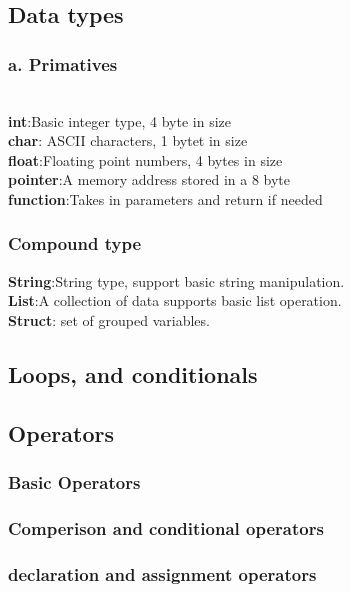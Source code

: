 \documentclass[11pt]{article}
\begin{document}
\subsection*{Data types}

\subsubsection*{a. Primatives}\\

\quad\space\space\textbf{int}:Basic integer type, 4 byte in size \\

\textbf{char}: ASCII characters, 1 bytet in size\\

\textbf{float}:Floating point numbers, 4 bytes in size\\

\textbf{pointer}:A memory address stored in a 8 byte\\

\textbf{function}:Takes in parameters and return if needed
\subsubsection{Compound type}

\quad\space\space\textbf{String}:String type, support basic string manipulation.\\

\textbf{List}:A collection of data supports basic list operation.\\

\textbf{Struct}: set of grouped variables.\\
\subsection{Loops, and conditionals}
\subsection{Operators}
\subsubsection{Basic Operators}
\subsubsection{Comperison and conditional operators}
\subsubsection{declaration and assignment operators}
\end{document}
